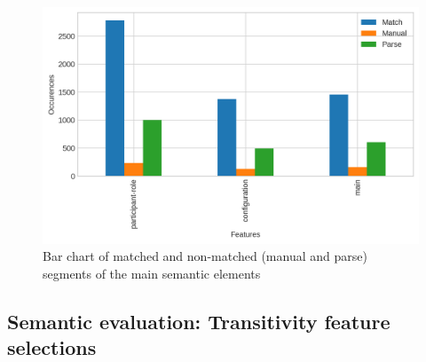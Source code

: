 \begin{figure}[!ht]
    \centering
    \includegraphics[width=.95\textwidth]{evaluation-results/figures/accuracy-semantic-figure-elements}
    \caption{Bar chart of matched and non-matched (manual and parse) segments of the main semantic elements}
    \label{fig:configuration-elements}
\end{figure}

\subsection{Semantic evaluation: Transitivity feature selections}


%

